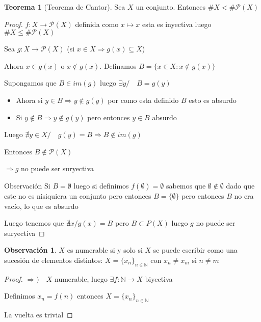 \documentclass[12pt]{article}
\newcommand{\N}{\mathbb{N}}
\newcommand{\Ra}{\Rightarrow}
\newcommand{\ra}{\rightarrow}
\theoremstyle{definition}
\newtheorem*{remark}{Observación}
\newtheorem{theorem}{Teorema}
\begin{document}
\begin{theorem}[Teorema de Cantor]
Sea $X$ un conjunto. Entonces $\# X < \# \mathcal{P}(X)$

\begin{proof}
  $f:X \ra \mathcal{P}(X)$ definida como $x \mapsto {x}$ esta es inyectiva luego $\# X \leq \# \mathcal{P}(X)$

Sea $g: X \ra \mathcal{P}(X)$ (si $ x \in X  \Ra g(x) \subseteq X$)

Ahora $x \in g(x)$ o $x \notin g(x)$. Definamos $B =\{x \in X : x \notin g(x)\}$

Supongamos que $B \in im(g)$ luego $\exists y / \quad B=g(y)$ 
\begin{itemize}
\item Ahora si $y \in B \Ra y \notin g(y)$ por como esta definido $B$ esto es absurdo

\item Si $y \notin B \Ra y \notin g(y)$ pero entonces $y \in B$ absurdo
\end{itemize}

Luego $\nexists y \in X / \quad g(y) = B \Ra B \notin im(g)$ 

Entonces $B \notin \mathcal{P}(X)$

$\Ra g$ no puede ser suryectiva

Observación Si $B = \emptyset$ luego si definimos $f(\emptyset) = \emptyset$ sabemos que $\emptyset \notin \emptyset$ dado que este no es nisiquiera un conjunto pero entonces $B=\{\emptyset \}$ pero entonces $B$ no era vacío, lo que es absurdo

Luego tenemos que $\nexists x / g(x) = B $ pero $B \subset P(X)$ luego $g$ no puede ser suryectiva
\end{proof}
\end{theorem}

\begin{remark}
  $X$ es numerable si y solo si $X$ se puede escribir como una sucesión de elementos distintos: $X = \{x_{n}\}_{n \in \N}$ con $x_{n} \neq x_{m}$ si $n \neq m$

  \begin{proof}
  $\Ra ) \quad X$ numerable, luego $ \exists f: \N \ra X$ biyectiva

  Definimos $x_{n} = f(n)$ entonces $X= \{x_{n}\}_{n \in \N}$
  
La vuelta es trivial
\end{proof}

\end{remark}
\end{document}
